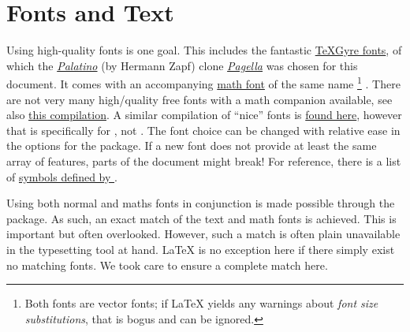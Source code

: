 \section{Fonts and Text}
\label{ch:fonts_text}

Using high-quality fonts is one goal.
This includes the fantastic
\href{https://ctan.org/texarchive/fonts/tex-gyre/opentype}{\TeX Gyre fonts},
of which the \emph{\href{https://en.wikipedia.org/wiki/Palatino}{Palatino}}
(by Hermann Zapf) clone \emph{\href{https://ctan.org/pkg/tex-gyre-pagella}{Pagella}}
was chosen for this document.
It comes with an accompanying
\href{https://ctan.org/texarchive/fonts/tex-gyre-math/opentype}{math font}
of the same name%
\footnote{
    Both fonts are vector fonts;
    if \LaTeX{} yields any warnings about \emph{font size substitutions},
    that is bogus and can be ignored.
}%
.
There are not very many high\-/quality free fonts with a math companion available,
see also \href{https://tex.stackexchange.com/a/425099/120853}{this compilation}.
A similar compilation of \enquote{nice} fonts is
\href{https://tex.stackexchange.com/a/59706/120853}{found here},
however that is specifically for , not .
The font choice can be changed with relative ease in the options for the
 package.
If a new font does not provide at least the same array of features,
parts of the document might break!
For reference, there is a list of
\href{http://mirrors.ctan.org/macros/unicodetex/latex/unicode-math/unimath-symbols.pdf}{symbols defined by }.

Using both normal and maths fonts in conjunction is made possible through the
 package.
As such, an exact match of the text and math fonts is achieved.
This is important but often overlooked.
However, such a match is often plain unavailable in the typesetting tool at hand.
\LaTeX{} is no exception here if there simply exist no matching fonts.
We took care to ensure a complete match here.


